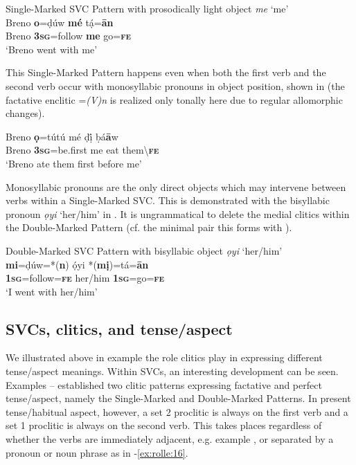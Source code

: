 \documentclass[output=paper]{langsci/langscibook}
\begin{document}
\ea\label{ex:rolle:11}
{Single-Marked SVC Pattern with prosodically light object \textit{me} ‘me’}\\
\gll  Breno  \textbf{o}=ḍúw    \textbf{mé}  tạ́=\textbf{ān}\\
     Breno   \textbf{3}\textbf{\textsc{sg}}=follow   \textbf{me}  go=\textbf{\textsc{fe}}\\
\glt ‘Breno went with me’ \citep[115]{Kari2004}
\z


This Single-Marked Pattern happens even when both the first verb and the second verb occur with monosyllabic pronouns in object position, shown in  (the factative enclitic =\textit{(V)n} is realized only tonally here due to regular allomorphic changes).

\ea\label{ex:rolle:12}
\gll  Breno   \textbf{ọ}=tútú     mé   ḍị́   ḅá\textbf{ā}w\\
     Breno  \textbf{\textsc{3sg}}=be.first  me  eat  them{\textbackslash}\textbf{\textsc{fe}}\\
\glt ‘Breno ate them first before me’
\z

Monosyllabic pronouns are the only direct objects which may intervene between verbs within a Single-Marked SVC. This is demonstrated with the bisyllabic pronoun \textit{ọyi} ‘her/him’ in . It is ungrammatical to delete the medial clitics within the Double-Marked Pattern (cf. the minimal pair this forms with ). 

\ea\label{ex:rolle:13}
{Double-Marked SVC Pattern with bisyllabic object \textit{ọyi} ‘her/him’}\\
\gll  \textbf{mi}=ḍúw=*(\textbf{n})     ọ́yi     *(\textbf{mị})=tá=\textbf{ān}\\
     \textbf{1\textsc{sg}}=follow=\textbf{\textsc{fe}}   her/him   \textbf{1\textsc{sg}}=go=\textbf{\textsc{fe}}\\
\glt ‘I went with her/him’ \citep[201]{Kari2004}
\z

\subsection{SVCs, clitics, and tense/aspect}

We illustrated above in example  the role clitics play in expressing different tense/aspect meanings. Within SVCs, an interesting development can be seen. Examples -- established two clitic patterns expressing factative and perfect tense/aspect, namely the Single-Marked and Double-Marked Patterns. In present tense/habitual aspect, however, a set 2 proclitic is always on the first verb and a set 1 proclitic is always on the second verb. This takes places regardless of whether the verbs are immediately adjacent, e.g. example , or separated by a pronoun or noun phrase as in -\ref{ex:rolle:16}. 
\end{document}
